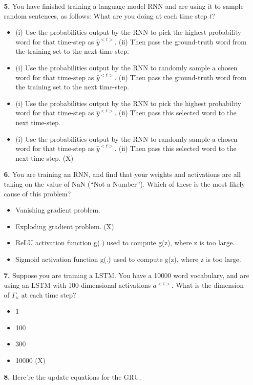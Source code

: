 \textbf{5.} You have finished training a language model RNN and are using it to sample random sentences, as follows:
What are you doing at each time step $t$?
\begin{itemize}
    \item (i) Use the probabilities output by the RNN to pick the highest probability word for that time-step as $\hat{y}^{<t>}$. (ii) Then pass the ground-truth word from the training set to the next time-step.
    \item (i) Use the probabilities output by the RNN to randomly sample a chosen word for that time-step as $\hat{y}^{<t>}$. (ii) Then pass the ground-truth word from the training set to the next time-step.
    \item (i) Use the probabilities output by the RNN to pick the highest probability word for that time-step as $\hat{y}^{<t>}$. (ii) Then pass this selected word to the next time-step.
    \item (i) Use the probabilities output by the RNN to randomly sample a chosen word for that time-step as $\hat{y}^{<t>}$. (ii) Then pass this selected word to the next time-step. (X)
\end{itemize}
\textbf{6.} You are training an RNN, and find that your weights and activations are all taking on the value of NaN (“Not a Number”). Which of these is the most likely cause of this problem?
\begin{itemize}
    \item Vanishing gradient problem.
    \item Exploding gradient problem. (X)
    \item ReLU activation function g(.) used to compute g(z), where z is too large.
    \item Sigmoid activation function g(.) used to compute g(z), where z is too large.
\end{itemize}
\textbf{7.} Suppose you are training a LSTM. You have a 10000 word vocabulary, and are using an LSTM with 100-dimensional activations $a^{<t>}$. What is the dimension of $\Gamma_u$ at each time step?
\begin{itemize}
    \item 1
    \item 100
    \item 300
    \item 10000 (X)
\end{itemize}
\textbf{8.} Here’re the update equations for the GRU.

